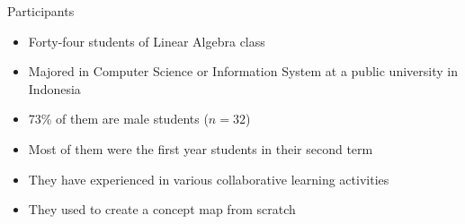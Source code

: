 \begin{frame}{Participants}

\begin{itemize}
    \item Forty-four students of Linear Algebra class
    \item Majored in Computer Science or Information System at a public university in Indonesia
    \item 73\% of them are male students ($n = 32$)
    \item Most of them were the first year students in their second term
    \item They have experienced in various collaborative learning activities
    \item They used to create a concept map from scratch
\end{itemize}

\end{frame}
